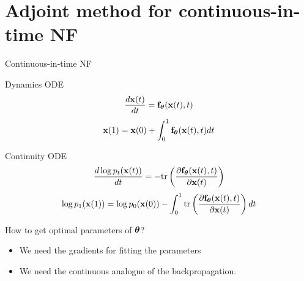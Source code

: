 \section{Adjoint method for continuous-in-time NF}
\begin{frame}{Continuous-in-time NF}
	\begin{block}{Dynamics ODE}
		\vspace{-0.3cm}
		\[
			 \frac{d \mathbf{x}(t)}{dt} = \mathbf{f}_{\boldsymbol{\theta}}(\mathbf{x}(t), t) 	 
 		\]
 		\[
			 \mathbf{x}(1) = \mathbf{x}(0) + \int_{0}^{1} \mathbf{f}_{\boldsymbol{\theta}}(\mathbf{x}(t), t) dt 
		\]
		\vspace{-0.5cm}
	\end{block}
	\begin{block}{Continuity ODE}
		\vspace{-0.2cm}
		\[
				\frac{d \log p_t(\mathbf{x}(t))}{d t} = - \text{tr} \left( \frac{\partial \mathbf{f}_{\boldsymbol{\theta}}(\mathbf{x}(t), t)}{\partial \mathbf{x}(t)} \right) 
 		\]
 		\[
				\log p_1(\mathbf{x}(1)) = \log p_0(\mathbf{x}(0)) - \int_{0}^{1} \text{tr} \left( \frac{\partial \mathbf{f}_{\boldsymbol{\theta}}(\mathbf{x}(t), t)}{\partial \mathbf{x}(t)} \right) dt
		\]
		\vspace{-0.3cm}
	\end{block}
	\begin{block}{How to get optimal parameters of $\boldsymbol{\theta}$?}
		\begin{itemize}
			\item We need the gradients for fitting the parameters
			\item We need the continuous analogue of the backpropagation.
		\end{itemize}
	\end{block}
	
\end{frame}
